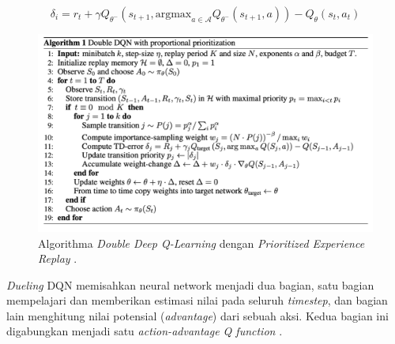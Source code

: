 \begin{equation}
  \delta_{i} = r_{t} + \gamma Q_{\theta^{-}} \left(s_{t+1}, \text{argmax}_{a\in\mathcal{A}}Q_{\theta ^{-}}(s_{t+1},a)\right) - Q_{\theta}(s_{t},a_{t}) 
  \label{Eq:DDQNTDErrorEquation}
\end{equation}

\begin{figure}[H]
  \centering
    \includegraphics[scale=0.4]{gambar/ddqn_per_algorithm.png}
    \caption{Algorithma \emph{Double Deep Q-Learning} dengan \emph{Prioritized Experience Replay} \citep{prioritizedER}.}
    \label{fig:dqnPerAlgorithm}
\end{figure}

\emph{Dueling} DQN memisahkan neural network menjadi dua bagian, satu bagian mempelajari dan memberikan estimasi nilai pada seluruh \emph{timestep},
dan bagian lain menghitung nilai potensial (\emph{advantage}) dari sebuah aksi.
Kedua bagian ini digabungkan menjadi satu \emph{action-advantage Q function} \citep{duelingDQN}.


